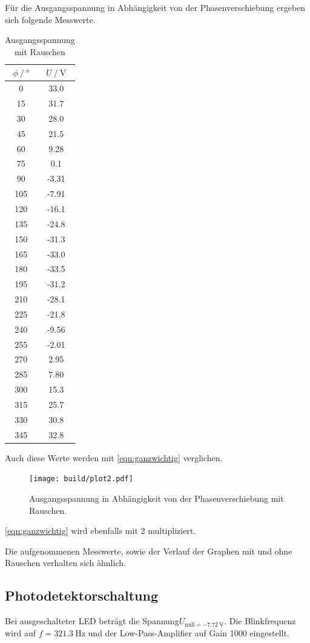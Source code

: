 Für die Ausgangsspannung in Abhängigkeit von der Phasenverschiebung ergeben sich folgende Messwerte.
\begin{table}
  \centering
  \caption{Ausgangsspannung mit Rauschen}
  \label{tab:ohne_Rauschen}
  \begin{tabular}{cc}
    \toprule {$\phi \:/\: °$} & {$U \:/\: \si{\volt}$} \\
    \midrule
    0	& 33.0 \\
    15 & 31.7 \\
    30 & 28.0 \\
    45	& 21.5 \\
    60 & 9.28 \\
    75 & 0.1 \\
    90	& -3.31 \\
    105 & -7.91 \\
    120	& -16.1 \\
    135	& -24.8 \\
    150	& -31.3 \\
    165 & -33.0 \\
    180	& -33.5 \\
    195	& -31.2 \\
    210	& -28.1 \\
    225	& -21.8 \\
    240 & -9.56 \\
    255	& -2.01 \\
    270	& 2.95 \\
    285	& 7.80 \\
    300	& 15.3 \\
    315	& 25.7 \\
    330	& 30.8 \\
    345	& 32.8 \\
    \bottomrule
    \end{tabular}
\end{table}

Auch diese Werte werden mit \ref{eqn:ganzwichtig} verglichen.
\begin{figure}
  \centering
  \texttt{[image: build/plot2.pdf]}
\caption{Ausgangsspannung in Abhängigkeit von der Phasenverschiebung mit Rauschen.}
  \label{fig:mit_rauschen}
\end{figure}
\ref{eqn:ganzwichtig} wird ebenfalls mit 2 multipliziert.

Die aufgenommenen Messwerte, sowie der Verlauf der Graphen mit und ohne Rauschen verhalten sich ähnlich.

\subsection{Photodetektorschaltung}
Bei ausgeschalteter LED beträgt die Spannung$U_{\mathrm{null} = \SI {-7,72}{\volt}}$.
Die Blinkfrequenz wird auf $f = \SI {321,3}{\Hz}$ und der Low-Pass-Amplifier auf Gain 1000 eingestellt.

